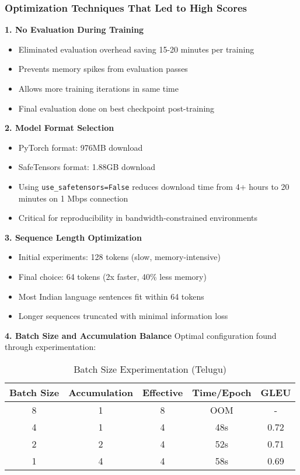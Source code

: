 \documentclass[12pt,a4paper]{article}
\begin{document}
\subsubsection{Optimization Techniques That Led to High Scores}

\textbf{1. No Evaluation During Training}
\begin{itemize}
    \item Eliminated evaluation overhead saving 15-20 minutes per training
    \item Prevents memory spikes from evaluation passes
    \item Allows more training iterations in same time
    \item Final evaluation done on best checkpoint post-training
\end{itemize}

\textbf{2. Model Format Selection}
\begin{itemize}
    \item PyTorch format: 976MB download
    \item SafeTensors format: 1.88GB download
    \item Using \texttt{use\_safetensors=False} reduces download time from 4+ hours to 20 minutes on 1 Mbps connection
    \item Critical for reproducibility in bandwidth-constrained environments
\end{itemize}

\textbf{3. Sequence Length Optimization}
\begin{itemize}
    \item Initial experiments: 128 tokens (slow, memory-intensive)
    \item Final choice: 64 tokens (2x faster, 40\% less memory)
    \item Most Indian language sentences fit within 64 tokens
    \item Longer sequences truncated with minimal information loss
\end{itemize}

\textbf{4. Batch Size and Accumulation Balance}
Optimal configuration found through experimentation:
\begin{table}[H]
\centering
\caption{Batch Size Experimentation (Telugu)}
\small
\begin{tabular}{ccccc}
\toprule
\textbf{Batch Size} & \textbf{Accumulation} & \textbf{Effective} & \textbf{Time/Epoch} & \textbf{GLEU} \\
\midrule
8 & 1 & 8 & OOM & - \\
4 & 1 & 4 & 48s & 0.72 \\
2 & 2 & 4 & 52s & 0.71 \\
1 & 4 & 4 & 58s & 0.69 \\
\bottomrule
\end{tabular}
\end{table}
\end{document}
